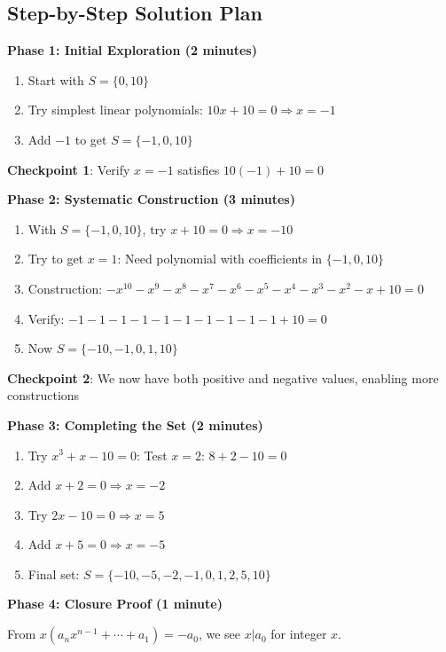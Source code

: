 \documentclass[12pt]{article}
\begin{document}
\begin{roadmapbox}
\subsection*{Step-by-Step Solution Plan}

\textbf{Phase 1: Initial Exploration (2 minutes)}
\begin{enumerate}
    \item Start with $S = \{0, 10\}$
    \item Try simplest linear polynomials: $10x + 10 = 0 \Rightarrow x = -1$
    \item Add $-1$ to get $S = \{-1, 0, 10\}$
\end{enumerate}

\textbf{Checkpoint 1}: Verify $x = -1$ satisfies $10(-1) + 10 = 0$ \checkmark

\textbf{Phase 2: Systematic Construction (3 minutes)}
\begin{enumerate}
    \item With $S = \{-1, 0, 10\}$, try $x + 10 = 0 \Rightarrow x = -10$
    \item Try to get $x = 1$: Need polynomial with coefficients in $\{-1, 0, 10\}$
    \item Construction: $-x^{10} - x^9 - x^8 - x^7 - x^6 - x^5 - x^4 - x^3 - x^2 - x + 10 = 0$
    \item Verify: $-1 - 1 - 1 - 1 - 1 - 1 - 1 - 1 - 1 - 1 + 10 = 0$ \checkmark
    \item Now $S = \{-10, -1, 0, 1, 10\}$
\end{enumerate}

\textbf{Checkpoint 2}: We now have both positive and negative values, enabling more constructions

\textbf{Phase 3: Completing the Set (2 minutes)}
\begin{enumerate}
    \item Try $x^3 + x - 10 = 0$: Test $x = 2$: $8 + 2 - 10 = 0$ \checkmark
    \item Add $x + 2 = 0 \Rightarrow x = -2$
    \item Try $2x - 10 = 0 \Rightarrow x = 5$
    \item Add $x + 5 = 0 \Rightarrow x = -5$
    \item Final set: $S = \{-10, -5, -2, -1, 0, 1, 2, 5, 10\}$
\end{enumerate}

\textbf{Phase 4: Closure Proof (1 minute)}

From $x(a_nx^{n-1} + \cdots + a_1) = -a_0$, we see $x | a_0$ for integer $x$.


\end{roadmapbox}
\end{document}
